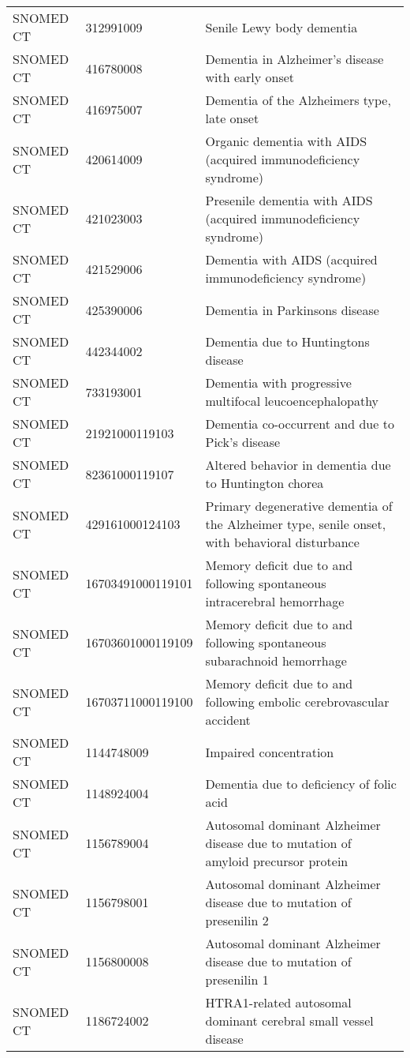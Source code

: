 \begin{longtable}{p{}p{}p{}}
  SNOMED CT & 312991009 & Senile Lewy body dementia \\ 
  SNOMED CT & 416780008 & Dementia in Alzheimer's disease with early onset \\ 
  SNOMED CT & 416975007 & Dementia of the Alzheimers type, late onset \\ 
  SNOMED CT & 420614009 & Organic dementia with AIDS (acquired immunodeficiency syndrome) \\ 
  SNOMED CT & 421023003 & Presenile dementia with AIDS (acquired immunodeficiency syndrome) \\ 
  SNOMED CT & 421529006 & Dementia with AIDS (acquired immunodeficiency syndrome) \\ 
  SNOMED CT & 425390006 & Dementia in Parkinsons disease \\ 
  SNOMED CT & 442344002 & Dementia due to Huntingtons disease \\ 
  SNOMED CT & 733193001 & Dementia with progressive multifocal leucoencephalopathy \\ 
  SNOMED CT & 21921000119103 & Dementia co-occurrent and due to Pick's disease \\ 
  SNOMED CT & 82361000119107 & Altered behavior in dementia due to Huntington chorea \\ 
  SNOMED CT & 429161000124103 & Primary degenerative dementia of the Alzheimer type, senile onset, with behavioral disturbance \\ 
  SNOMED CT & 16703491000119101 & Memory deficit due to and following spontaneous intracerebral hemorrhage \\ 
  SNOMED CT & 16703601000119109 & Memory deficit due to and following spontaneous subarachnoid hemorrhage \\ 
  SNOMED CT & 16703711000119100 & Memory deficit due to and following embolic cerebrovascular accident \\ 
  SNOMED CT & 1144748009 & Impaired concentration \\ 
  SNOMED CT & 1148924004 & Dementia due to deficiency of folic acid \\ 
  SNOMED CT & 1156789004 & Autosomal dominant Alzheimer disease due to mutation of amyloid precursor protein \\ 
  SNOMED CT & 1156798001 & Autosomal dominant Alzheimer disease due to mutation of presenilin 2 \\ 
  SNOMED CT & 1156800008 & Autosomal dominant Alzheimer disease due to mutation of presenilin 1 \\ 
  SNOMED CT & 1186724002 & HTRA1-related autosomal dominant cerebral small vessel disease \\ 

\end{longtable}
